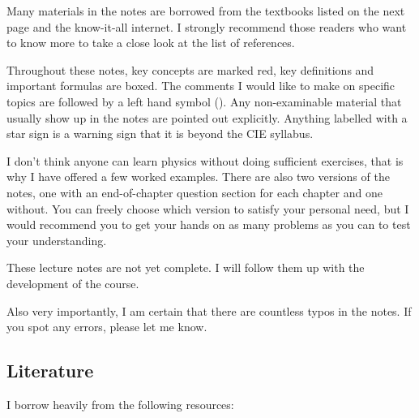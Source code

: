 Many materials in the notes are borrowed from the textbooks listed on the next page and the know-it-all internet. I strongly recommend those readers who want to know more to take a close look at the list of references.

Throughout these notes, key concepts are marked red, key definitions and important formulas are boxed. The comments I would like to make on specific topics are followed by a left hand symbol (). Any non-examinable material that usually show up in the notes are pointed out explicitly. Anything labelled with a star sign is a warning sign that it is beyond the CIE syllabus.

I don't think anyone can learn physics without doing sufficient exercises, that is why I have offered a few worked examples. There are also two versions of the notes, one with an end-of-chapter question section for each chapter and one without. You can freely choose which version to satisfy your personal need, but I would recommend you to get your hands on as many problems as you can to test your understanding.

These lecture notes are not yet complete. I will follow them up with the development of the course.

Also very importantly, I am certain that there are countless typos in the notes. If you spot any errors, please let me know.



\subsection*{Literature}

I borrow heavily from the following resources:

